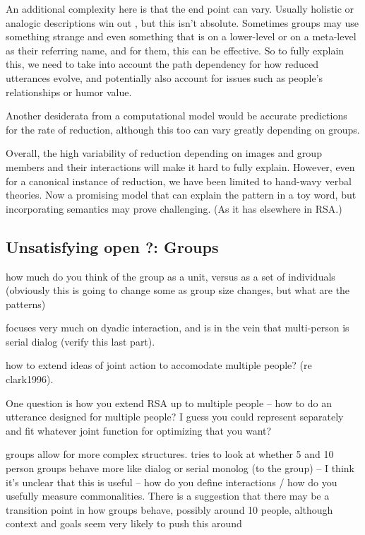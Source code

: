 \documentclass[]{article}
\begin{document}
An additional complexity here is that the end point can vary. Usually holistic or analogic descriptions win out \cite{clark1986}, but this isn't absolute. Sometimes groups may use something strange and even something that is on a lower-level or on a meta-level as their referring name, and for them, this can be effective. So to fully explain this, we need to take into account the path dependency for how reduced utterances evolve, and potentially also account for issues such as people's relationships or humor value. 

Another desiderata from a computational model would be accurate predictions for the rate of reduction, although this too can vary greatly depending on groups. 

Overall, the high variability of reduction depending on images and group members and their interactions will make it hard to fully explain. However, even for a canonical instance of reduction, we have been limited to hand-wavy verbal theories. Now a promising model that can explain the pattern in a toy word, but incorporating semantics may prove challenging. (As it has elsewhere in RSA.) 



\subsection{Unsatisfying open ?: Groups}


\cite{yoon2019} how much do you think of the group as a unit, versus as a set of individuals (obviously this is going to change some as group size changes, but what are the patterns) 

\cite{clark1996} focuses very much on dyadic interaction, and is in the vein that multi-person is serial dialog (verify this last part). 

how to extend ideas of joint action to accomodate multiple people? (re clark1996). 

One question is how you extend RSA up to multiple people -- how to do an utterance designed for multiple people? I guess you could represent separately and fit whatever joint function for optimizing that you want? 

groups allow for more complex structures. \cite{fay2000} tries to look at whether 5 and 10 person groups behave more like dialog or serial monolog (to the group) -- I think it's unclear that this is useful -- how do you define interactions / how do you usefully measure commonalities. There is a suggestion that there may be a transition point in how groups behave, possibly around 10 people, although context and goals seem very likely to push this around 
\end{document}
